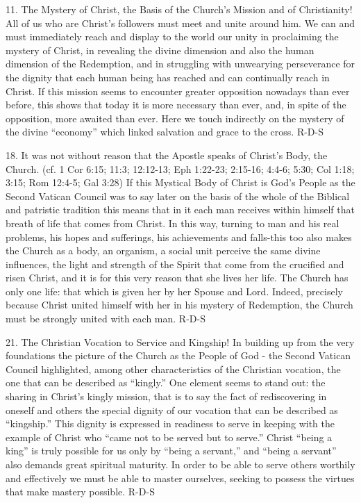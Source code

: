 \documentclass[oneside]{book}
\begin{document}
11. The Mystery of Christ, the Basis of the Church's Mission and of
Christianity! All of us who are Christ's followers must meet and unite around
him. We can and must immediately reach and display to the world our unity in
proclaiming the mystery of Christ, in revealing the divine dimension and also
the human dimension of the Redemption, and in struggling with unwearying
perseverance for the dignity that each human being has reached and can
continually reach in Christ. If this mission seems to encounter greater
opposition nowadays than ever before, this shows that today it is more necessary
than ever, and, in spite of the opposition, more awaited than ever. Here we
touch indirectly on the mystery of the divine ``economy'' which linked salvation
and grace to the cross.
R-D-S

18. It was not without reason that the Apostle speaks of Christ's Body, the
Church. (cf. 1 Cor 6:15; 11:3; 12:12-13; Eph 1:22-23; 2:15-16; 4:4-6; 5:30; Col
1:18; 3:15; Rom 12:4-5; Gal 3:28) If this Mystical Body of Christ is God's
People  as the Second Vatican Council was to say later on the basis of the whole
of the Biblical and patristic tradition  this means that in it each man receives
within himself that breath of life that comes from Christ. In this way, turning
to man and his real problems, his hopes and sufferings, his achievements and
falls-this too also makes the Church as a body, an organism, a social unit
perceive the same divine influences, the light and strength of the Spirit that
come from the crucified and risen Christ, and it is for this very reason that
she lives her life. The Church has only one life: that which is given her by her
Spouse and Lord. Indeed, precisely because Christ united himself with her in his
mystery of Redemption, the Church must be strongly united with each man.
R-D-S

21. The Christian Vocation to Service and Kingship! In building up from the very
foundations the picture of the Church as the People of God - the Second Vatican
Council highlighted, among other characteristics of the Christian vocation, the
one that can be described as ``kingly.'' One element seems to stand out: the
sharing in Christ's kingly mission, that is to say the fact of rediscovering in
oneself and others the special dignity of our vocation that can be described as
``kingship.'' This dignity is expressed in readiness to serve in keeping with
the example of Christ who ``came not to be served but to serve.'' Christ ``being
a king'' is truly possible for us only by ``being a servant,'' and ``being a
servant'' also demands great spiritual maturity. In order to be able to serve
others worthily and effectively we must be able to master ourselves, seeking to
possess the virtues that make mastery possible.
R-D-S
\end{document}
